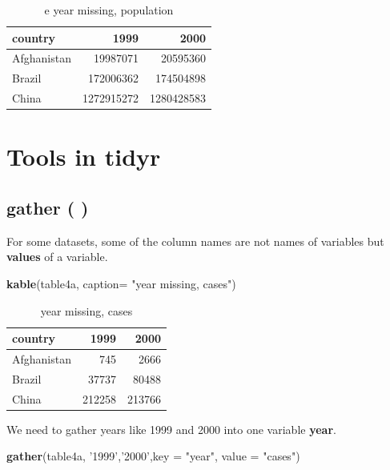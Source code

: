 \documentclass[]{book}
\newenvironment{Shaded}{\begin{snugshade}}{\end{snugshade}}
\newcommand{\KeywordTok}[1]{\textcolor[rgb]{0.13,0.29,0.53}{\textbf{#1}}}
\newcommand{\DataTypeTok}[1]{\textcolor[rgb]{0.13,0.29,0.53}{#1}}
\newcommand{\StringTok}[1]{\textcolor[rgb]{0.31,0.60,0.02}{#1}}
\newcommand{\NormalTok}[1]{#1}
\begin{document}
\begin{table}[t]

\caption{\label{tab:unnamed-chunk-12}e year missing, population}
\centering
\begin{tabular}{l|r|r}
\hline
country & 1999 & 2000\\
\hline
Afghanistan & 19987071 & 20595360\\
\hline
Brazil & 172006362 & 174504898\\
\hline
China & 1272915272 & 1280428583\\
\hline
\end{tabular}
\end{table}

\section{Tools in tidyr}\label{tools-in-tidyr}

\subsection{gather ( )}\label{gather}

For some datasets, some of the column names are not names of variables
but \textbf{values} of a variable.

\begin{Shaded}
\begin{Highlighting}[]
\KeywordTok{kable}\NormalTok{(table4a, }\DataTypeTok{caption=} \StringTok{"year missing, cases"}\NormalTok{)}
\end{Highlighting}
\end{Shaded}

\begin{table}[t]

\caption{\label{tab:unnamed-chunk-13}year missing, cases}
\centering
\begin{tabular}{l|r|r}
\hline
country & 1999 & 2000\\
\hline
Afghanistan & 745 & 2666\\
\hline
Brazil & 37737 & 80488\\
\hline
China & 212258 & 213766\\
\hline
\end{tabular}
\end{table}

We need to gather years like 1999 and 2000 into one variable
\textbf{year}.

\begin{Shaded}
\begin{Highlighting}[]
\KeywordTok{gather}\NormalTok{(table4a, }\StringTok{'1999'}\NormalTok{,}\StringTok{'2000'}\NormalTok{,}\DataTypeTok{key =} \StringTok{"year"}\NormalTok{, }\DataTypeTok{value =} \StringTok{"cases"}\NormalTok{)}
\end{Highlighting}
\end{Shaded}
\end{document}
